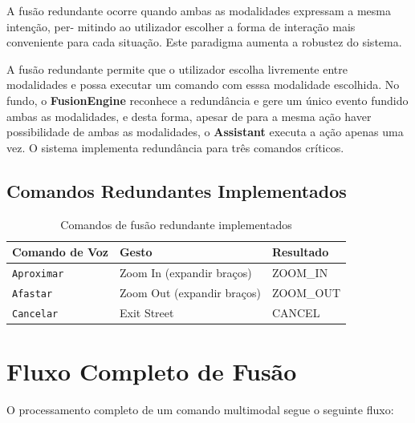 \documentclass{report}
\begin{document}
A fusão redundante ocorre quando ambas as modalidades expressam a mesma intenção, per-
mitindo ao utilizador escolher a forma de interação mais conveniente para cada situação. Este
paradigma aumenta a robustez do sistema.

A fusão redundante permite que o utilizador escolha livremente entre modalidades e possa executar um comando com esssa modalidade escolhida. No fundo, o \textbf{FusionEngine} reconhece a redundância e gere um único evento fundido ambas as modalidades, e desta forma, apesar de para a mesma ação haver possibilidade de ambas as modalidades, o \textbf{Assistant} executa a ação apenas uma vez. O sistema implementa redundância para três comandos críticos.

\subsection{Comandos Redundantes Implementados}


\begin{longtable}{p{} p{} p{}}
    \caption{Comandos de fusão redundante implementados} 
    \label{tab:redundant-fusion} \\
    
    \toprule
    \textbf{Comando de Voz} & \textbf{Gesto} & \textbf{Resultado} \\
    \midrule
    \endfirsthead
    \endlastfoot
    
    \texttt{Aproximar} & Zoom In (expandir braços)& ZOOM\_IN  \\
    \texttt{Afastar} & Zoom Out (expandir braços) & ZOOM\_OUT \\
    \texttt{Cancelar} & Exit Street & CANCEL \\
\end{longtable}



\section{Fluxo Completo de Fusão}

O processamento completo de um comando multimodal segue o seguinte fluxo:
\end{document}
